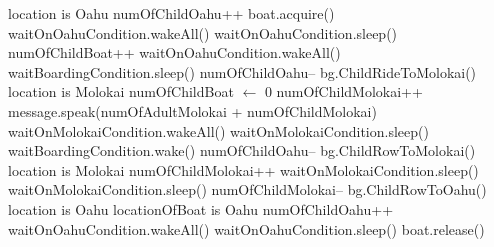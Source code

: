 \documentclass{article}
\begin{document}
\begin{algorithm}
    \begin{algorithmic}
        \State location is Oahu
        \State numOfChildOahu++
            \State boat.acquire()
                        \State waitOnOahuCondition.wakeAll()
                    \EndIf
                    \State waitOnOahuCondition.sleep()
                \EndWhile
                \State numOfChildBoat++
                    \State waitOnOahuCondition.wakeAll()
                    \State waitBoardingCondition.sleep()
                    \State numOfChildOahu--
                    \State bg.ChildRideToMolokai()
                    \State location is Molokai
                    \State numOfChildBoat $\leftarrow$ 0
                    \State numOfChildMolokai++
                    \State message.speak(numOfAdultMolokai + numOfChildMolokai)
                    \State waitOnMolokaiCondition.wakeAll()
                    \State waitOnMolokaiCondition.sleep()
                \Else
                    \State waitBoardingCondition.wake()
                    \State numOfChildOahu--
                    \State bg.ChildRowToMolokai()
                    \State location is Molokai
                    \State numOfChildMolokai++
                    \State waitOnMolokaiCondition.sleep()
                \EndIf
            \Else
                    \State waitOnMolokaiCondition.sleep()
                \EndWhile
                \State numOfChildMolokai--
                \State bg.ChildRowToOahu()
                \State location is Oahu
                \State locationOfBoat is Oahu
                \State numOfChildOahu++
                \State waitOnOahuCondition.wakeAll()
                \State waitOnOahuCondition.sleep()
            \EndIf
            \State boat.release()
        \EndWhile
    \EndProcedure
    \end{algorithmic}
\end{algorithm}
\end{document}
